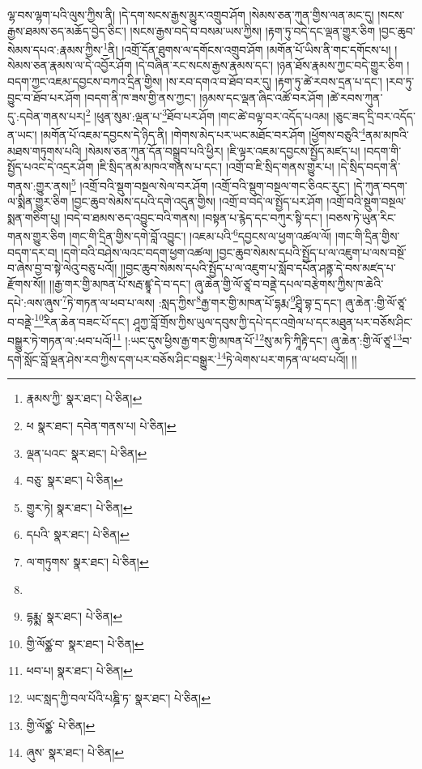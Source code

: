 ལྷ་བས་ལྷག་པའི་ལུས་ཀྱིས་ནི། །དེ་དག་སངས་རྒྱས་མྱུར་འགྲུབ་ཤོག །སེམས་ཅན་ཀུན་གྱིས་ལན་མང་དུ། །སངས་རྒྱས་ཐམས་ཅད་མཆོད་བྱེད་ཅིང་། །སངས་རྒྱས་བདེ་བ་བསམ་ཡས་ཀྱིས། །རྟག་ཏུ་བདེ་དང་ལྡན་གྱུར་ཅིག །བྱང་ཆུབ་སེམས་དཔའ་:རྣམས་ཀྱིས་\footnote{རྣམས་ཀྱི་  སྣར་ཐང་།  པེ་ཅིན། }ནི། །འགྲོ་དོན་ཐུགས་ལ་དགོངས་འགྲུབ་ཤོག །མགོན་པོ་ཡིས་ནི་གང་དགོངས་པ། །སེམས་ཅན་རྣམས་ལ་དེ་འབྱོར་ཤོག །དེ་བཞིན་རང་སངས་རྒྱས་རྣམས་དང་། །ཉན་ཐོས་རྣམས་ཀྱང་བདེ་གྱུར་ཅིག །བདག་ཀྱང་འཇམ་དབྱངས་བཀའ་དྲིན་གྱིས། །ས་རབ་དགའ་བ་ཐོབ་བར་དུ། །རྟག་ཏུ་ཚེ་རབས་དྲན་པ་དང་། །རབ་ཏུ་བྱུང་བ་ཐོབ་པར་ཤོག །བདག་ནི་ཁ་ཟས་གྱི་ནས་ཀྱང་། །ཉམས་དང་ལྡན་ཞིང་འཚོ་བར་ཤོག །ཚེ་རབས་ཀུན་དུ་:དབེན་གནས་པར།\footnote{ཕ  སྣར་ཐང་། དབེན་གནས་པ།  པེ་ཅིན། } །ཕུན་སུམ་:ལྡན་པ་\footnote{ལྡན་པའང་  སྣར་ཐང་།  པེ་ཅིན། }ཐོབ་པར་ཤོག །གང་ཚེ་བལྟ་བར་འདོད་པའམ། །ཅུང་ཟད་དྲི་བར་འདོད་ན་ཡང་། །མགོན་པོ་འཇམ་དབྱངས་དེ་ཉིད་ནི། །གེགས་མེད་པར་ཡང་མཐོང་བར་ཤོག །ཕྱོགས་བཅུའི་\footnote{བཅུ་  སྣར་ཐང་།  པེ་ཅིན། }ནམ་མཁའི་མཐས་གཏུགས་པའི། །སེམས་ཅན་ཀུན་དོན་བསྒྲུབ་པའི་ཕྱིར། །ཇི་ལྟར་འཇམ་དབྱངས་སྤྱོད་མཛད་པ། །བདག་གི་སྤྱོད་པའང་དེ་འདྲར་ཤོག །ཇི་སྲིད་ནམ་མཁའ་གནས་པ་དང་། །འགྲོ་བ་ཇི་སྲིད་གནས་གྱུར་པ། །དེ་སྲིད་བདག་ནི་གནས་:གྱུར་ནས།\footnote{གྱུར་ཏེ།  སྣར་ཐང་།  པེ་ཅིན། } །འགྲོ་བའི་སྡུག་བསྔལ་སེལ་བར་ཤོག །འགྲོ་བའི་སྡུག་བསྔལ་གང་ཅིའང་རུང་། །དེ་ཀུན་བདག་ལ་སྨིན་གྱུར་ཅིག །བྱང་ཆུབ་སེམས་དཔའི་དགེ་འདུན་གྱིས། །འགྲོ་བ་བདེ་ལ་སྤྱོད་པར་ཤོག །འགྲོ་བའི་སྡུག་བསྔལ་སྨན་གཅིག་པུ། །བདེ་བ་ཐམས་ཅད་འབྱུང་བའི་གནས། །བསྟན་པ་རྙེད་དང་བཀུར་སྟི་དང་། །བཅས་ཏེ་ཡུན་རིང་གནས་གྱུར་ཅིག །གང་གི་དྲིན་གྱིས་དགེ་བློ་འབྱུང་། །འཇམ་པའི་\footnote{དཔའི་  སྣར་ཐང་།  པེ་ཅིན། }དབྱངས་ལ་ཕྱག་འཚལ་ལོ། །གང་གི་དྲིན་གྱིས་བདག་དར་བ། །དགེ་བའི་བཤེས་ལའང་བདག་ཕྱག་འཚལ། །བྱང་ཆུབ་སེམས་དཔའི་སྤྱོད་པ་ལ་འཇུག་པ་ལས་བསྔོ་བ་ཞེས་བྱ་བ་སྟེ་ལེའུ་བཅུ་པའོ།། །།བྱང་ཆུབ་སེམས་དཔའི་སྤྱོད་པ་ལ་འཇུག་པ་སློབ་དཔོན་ཤནྟ་དེ་བས་མཛད་པ་རྫོགས་སོ།། །།རྒྱ་གར་གྱི་མཁན་པོ་སརྦ་ཛྙཱ་དེ་བ་དང་། ཞུ་ཆེན་གྱི་ལོ་ཙཱ་བ་བནྡེ་དཔལ་བརྩེགས་ཀྱིས་ཁ་ཆེའི་དཔེ་:ལས་ཞུས་\footnote{ལ་གཏུགས་  སྣར་ཐང་།  པེ་ཅིན། }ཏེ་གཏན་ལ་ཕབ་པ་ལས། :སླད་ཀྱིས་\footnote{}རྒྱ་གར་གྱི་མཁན་པོ་དྷརྨ་\footnote{དྷརྨྨ་  སྣར་ཐང་།  པེ་ཅིན། }ཤྲཱི་བྷ་དྲ་དང་། ཞུ་ཆེན་:གྱི་ལོ་ཙཱ་བ་བནྡེ་\footnote{གྱི་ལོཙྪ་བ་  སྣར་ཐང་།  པེ་ཅིན། }རིན་ཆེན་བཟང་པོ་དང་། ཤཱཀྱ་བློ་གྲོས་ཀྱིས་ཡུལ་དབུས་ཀྱི་དཔེ་དང་འགྲེལ་པ་དང་མཐུན་པར་བཅོས་ཤིང་བསྒྱུར་ཏེ་གཏན་ལ་:ཕབ་པའོ།\footnote{ཕབ་པ།  སྣར་ཐང་།  པེ་ཅིན། } །:ཡང་དུས་ཕྱིས་རྒྱ་གར་གྱི་མཁན་པོ་\footnote{ཡང་སླད་ཀྱི་བལ་པོའི་པཎྜི་ཏ་  སྣར་ཐང་།  པེ་ཅིན། }སུ་མ་ཏི་ཀཱིརྟི་དང་། ཞུ་ཆེན་:གྱི་ལོ་ཙཱ་\footnote{གྱི་ལོཙྪ་  པེ་ཅིན། }བ་དགེ་སློང་བློ་ལྡན་ཤེས་རབ་ཀྱིས་དག་པར་བཅོས་ཤིང་བསྒྱུར་\footnote{ཞུས་  སྣར་ཐང་།  པེ་ཅིན། }ཏེ་ལེགས་པར་གཏན་ལ་ཕབ་པའོ།། །།